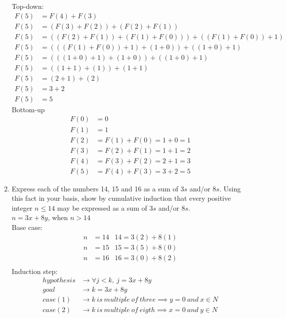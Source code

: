 \documentclass{article}
\begin{document}
\begin{enumerate}
    Top-down:
    \begin{align*}
        F(5) &= F(4) + F(3) \\
        F(5) &= (F(3) + F(2)) + (F(2) + F(1)) \\
        F(5) &= ((F(2) + F(1)) + (F(1) + F(0))) + ((F(1) + F(0)) + 1)\\
        F(5) &= (((F(1) + F(0)) + 1) + (1 + 0)) + ((1 + 0) + 1)\\
        F(5) &= (((1+ 0) + 1) + (1 + 0)) + ((1 + 0) + 1)\\
        F(5) &= ((1 + 1) + (1)) + (1 + 1)\\
        F(5) &= (2 + 1) + (2)\\
        F(5) &= 3 + 2\\
        F(5) &= 5
    \end{align*}
    Bottom-up
    \begin{align*}
        F(0) &= 0 \\
        F(1) &= 1 \\
        F(2) &= F(1) + F(0) = 1 + 0 = 1\\
        F(3) &= F(2) + F(1) = 1 + 1 = 2\\
        F(4) &= F(3) + F(2) = 2 + 1 = 3\\
        F(5) &= F(4) + F(3) = 3 + 2 = 5
    \end{align*}
    \item Express each of the numbers 14, 15 and 16 as a sum of $3s$ and/or $8s$. Using this fact in your basis, show by cumulative induction that every positive integer $n \leq 14$ may be expressed as a sum of $3s$ and/or $8s$.\\
    $n = 3x + 8y$, when $n > 14$\\
    Base case:
    \begin{align*}
        n &= 14 & 14 = 3(2) + 8(1)\\
        n &= 15 & 15 = 3(5) + 8(0)\\
        n &= 16 & 16 = 3(0) + 8(2)\\
    \end{align*}
    Induction step:
    \begin{align*}
        hypothesis &\rightarrow \forall j < k,\ j = 3x + 8y\\
        goal &\rightarrow k = 3x + 8y\\
        case (1) &\rightarrow k\ is\ multiple\ of\ three \implies y = 0\ and\ x \in N\\
        case (2) &\rightarrow k\ is\ multiple\ of\ eigth \implies x = 0\ and\ y \in N\\

\end{align*}
\end{enumerate}
\end{document}
